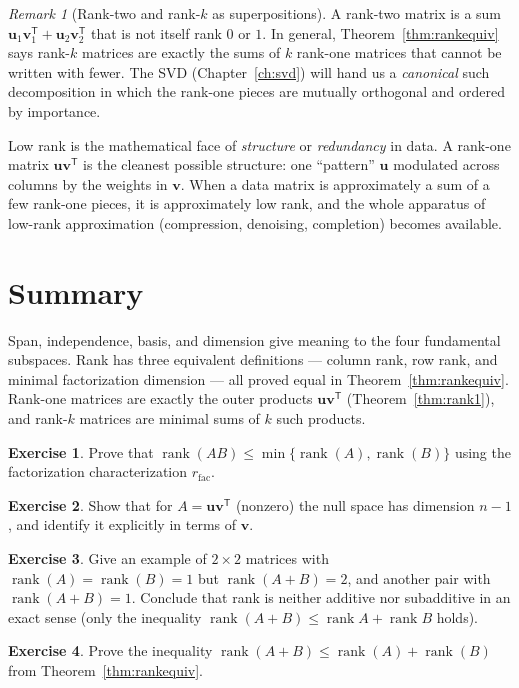 \documentclass[11pt,oneside]{book}
\theoremstyle{plain}
\theoremstyle{definition}
\newtheorem{exercise}{Exercise}[chapter]
\theoremstyle{remark}
\newtheorem{remark}[theorem]{Remark}
\newcommand{\rank}{\operatorname{rank}}
\newcommand{\T}{^{\mathsf T}}
\newcommand{\bu}{\mathbf{u}}
\newcommand{\bv}{\mathbf{v}}
\begin{document}
\begin{remark}[Rank-two and rank-$k$ as superpositions]
A rank-two matrix is a sum $\bu_1\bv_1\T+\bu_2\bv_2\T$ that is not itself rank $0$ or
$1$. In general, Theorem~\ref{thm:rankequiv} says rank-$k$ matrices are exactly the sums
of $k$ rank-one matrices that cannot be written with fewer. The SVD
(Chapter~\ref{ch:svd}) will hand us a \emph{canonical} such decomposition in which the
rank-one pieces are mutually orthogonal and ordered by importance.
\end{remark}

\begin{ml_box}
Low rank is the mathematical face of \emph{structure} or \emph{redundancy} in data. A
rank-one matrix $\bu\bv\T$ is the cleanest possible structure: one ``pattern'' $\bu$
modulated across columns by the weights in $\bv$. When a data matrix is approximately a
sum of a few rank-one pieces, it is approximately low rank, and the whole apparatus of
low-rank approximation (compression, denoising, completion) becomes available.
\end{ml_box}

\section*{Summary}
Span, independence, basis, and dimension give meaning to the four fundamental subspaces.
Rank has three equivalent definitions --- column rank, row rank, and minimal
factorization dimension --- all proved equal in Theorem~\ref{thm:rankequiv}. Rank-one
matrices are exactly the outer products $\bu\bv\T$ (Theorem~\ref{thm:rank1}), and
rank-$k$ matrices are minimal sums of $k$ such products.

\begin{exercise}
Prove that $\rank(AB)\le\min\{\rank(A),\rank(B)\}$ using the factorization
characterization $r_{\mathrm{fac}}$.
\end{exercise}
\begin{exercise}
Show that for $A=\bu\bv\T$ (nonzero) the null space has dimension $n-1$, and identify it
explicitly in terms of $\bv$.
\end{exercise}
\begin{exercise}
Give an example of $2\times2$ matrices with $\rank(A)=\rank(B)=1$ but $\rank(A+B)=2$,
and another pair with $\rank(A+B)=1$. Conclude that rank is neither additive nor
subadditive in an exact sense (only the inequality $\rank(A+B)\le\rank A+\rank B$ holds).
\end{exercise}
\begin{exercise}
Prove the inequality $\rank(A+B)\le\rank(A)+\rank(B)$ from Theorem~\ref{thm:rankequiv}.
\end{exercise}
\end{document}
